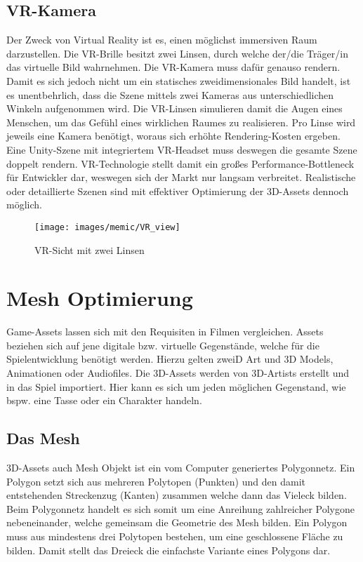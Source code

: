 \subsection{VR-Kamera}

Der Zweck von Virtual Reality ist es, einen möglichst immersiven Raum darzustellen. Die VR-Brille besitzt zwei Linsen, durch welche der/die Träger/in das virtuelle Bild wahrnehmen. Die VR-Kamera muss dafür genauso rendern. Damit es sich jedoch nicht um ein statisches zweidimensionales Bild handelt, ist es unentbehrlich, dass die Szene mittels zwei Kameras aus unterschiedlichen Winkeln aufgenommen wird. Die VR-Linsen simulieren damit die Augen eines Menschen, um das Gefühl eines wirklichen Raumes zu realisieren. Pro Linse wird jeweils eine Kamera benötigt, woraus sich erhöhte Rendering-Kosten ergeben. Eine Unity-Szene mit integriertem VR-Headset muss deswegen die gesamte Szene doppelt rendern. VR-Technologie stellt damit ein großes Performance-Bottleneck für Entwickler dar, weswegen sich der Markt nur langsam verbreitet. Realistische oder detaillierte Szenen sind mit effektiver Optimierung der 3D-Assets dennoch möglich.
\begin{figure}[H]
	\centering
	\texttt{[image: images/memic/VR\_view]}
	\caption{VR-Sicht mit zwei Linsen}
\end{figure}
\cite{_vrview}

\section{Mesh Optimierung}

Game-Assets lassen sich mit den Requisiten in Filmen vergleichen. Assets beziehen sich auf jene digitale bzw. virtuelle Gegenstände, welche für die Spielentwicklung benötigt werden. Hierzu gelten zweiD Art und 3D Models, Animationen oder Audiofiles. Die 3D-Assets werden von 3D-Artists erstellt und in das Spiel importiert. Hier kann es sich um jeden möglichen Gegenstand, wie bspw. eine Tasse oder ein Charakter handeln.

\subsection{Das Mesh}

3D-Assets auch Mesh Objekt ist ein vom Computer generiertes Polygonnetz. Ein Polygon setzt sich aus mehreren Polytopen (Punkten) und den damit entstehenden Streckenzug (Kanten) zusammen welche dann das Vieleck bilden. Beim Polygonnetz handelt es sich somit um eine Anreihung zahlreicher Polygone nebeneinander, welche gemeinsam die Geometrie des Mesh bilden. Ein Polygon muss aus mindestens drei Polytopen bestehen, um eine geschlossene Fläche zu bilden. Damit stellt das Dreieck die einfachste Variante eines Polygons dar.\cite{_the_essential_guide_to_3D}

